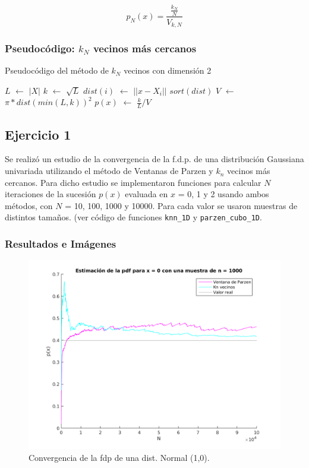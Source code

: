 \begin{equation}
p_N(x) = \frac{\frac{k_N}{N}}{V_{k,N}}
\end{equation}

\subsubsection{Pseudocódigo: $k_N$ vecinos más cercanos}

\begin{algorithm}[H]
  \begin{algorithmic}[1]
  \caption{Pseudocódigo del método de $k_N$ vecinos con dimensión 2}
  \label{algo:3-2}
	\State $L$ $\gets$ $|X|$
	\State $k$ $\gets$ $\sqrt{L}$
		\State $dist(i)$ $\gets$ $||x - X_i||$
	\EndFor
	\State $sort(dist)$
	\State $V$ $\gets$ $\pi * dist(min(L,k))^2$
	\State $p(x)$ $\gets$ $\frac{k}{L} / V$
	\EndProcedure
	\end{algorithmic}
\end{algorithm}

\subsection{Ejercicio 1}

Se realizó un estudio de la convergencia de la f.d.p. de una distribución Gaussiana univariada utilizando el método de Ventanas de Parzen y $k_{n}$ vecinos más cercanos.
Para dicho estudio se implementaron funciones para calcular $N$ iteraciones de la sucesión $p(x)$ evaluada en $x$ = 0, 1 y 2 usando ambos métodos, con $N$ = 10, 100, 1000 y 10000. Para cada valor se usaron muestras de distintos tamaños. (ver código de funciones \texttt{knn\_1D} y \texttt{parzen\_cubo\_1D}.

\subsubsection{Resultados e Imágenes}

\begin{figure}[ht!]
\centering
\includegraphics[width=120mm]{img/tp3/ej1-1.png}
\caption{Convergencia de la fdp de una dist. Normal (1,0).}
\end{figure}

